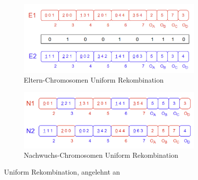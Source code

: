\begin{figure}[H]
    \centering
    \begin{subfigure}[b]{\textwidth}
    	\centering
    	\includegraphics[scale = 0.755]{Bilder/BeispielUniformCrossover.png}
    	\caption{Eltern-Chromosomen Uniform Rekombination}
    	\label{fig:uniformCrossoverEltern}
    \end{subfigure}
    
    \hfill
    
    \begin{subfigure}[b]{\textwidth}
    	\centering
    	\includegraphics[scale = 0.49]{Bilder/BeispielUniformCrossover2.png}
    	\caption{Nachwuchs-Chromosomen Uniform Rekombination}
    	\label{fig:uniformCrossoverNachwuchs}
    \end{subfigure}
    \caption{Uniform Rekombination, angelehnt an \cite{torabi_using_2022}}
    \label{fig:uniformGesamt}
\end{figure}

